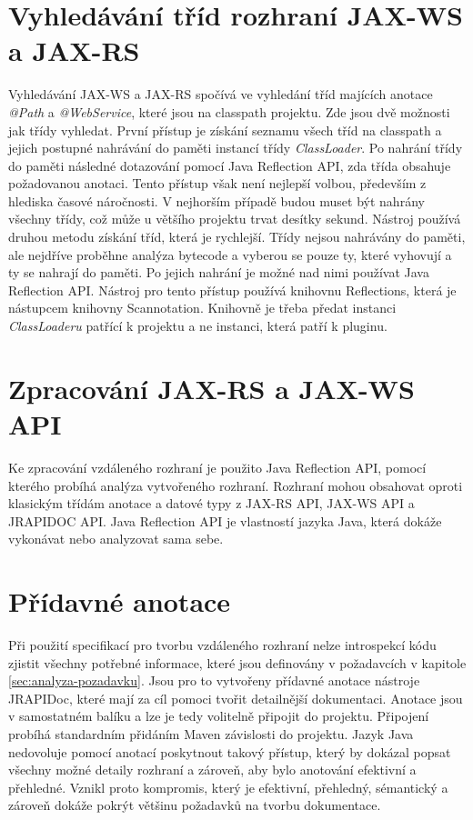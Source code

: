 \documentclass[11pt,twoside,a4paper]{book}
\begin{document}
\section{Vyhledávání tříd rozhraní JAX-WS a JAX-RS}

Vyhledávání JAX-WS a JAX-RS spočívá ve vyhledání tříd majících anotace {\em
@Path} a {\em @WebService}, které jsou na classpath projektu. Zde jsou dvě
možnosti jak třídy vyhledat.
První přístup je získání seznamu všech tříd na classpath a jejich postupné
nahrávání do paměti instancí třídy {\em ClassLoader}. Po nahrání třídy do paměti
následné dotazování pomocí Java Reflection API, zda třída obsahuje požadovanou
anotaci. Tento přístup však není nejlepší volbou, především z hlediska časové
náročnosti. V nejhorším případě budou muset být nahrány všechny třídy, což může
u většího projektu trvat desítky sekund. Nástroj používá druhou metodu získání
tříd, která je rychlejší. Třídy nejsou nahrávány do paměti, ale nejdříve
proběhne analýza bytecode a vyberou se pouze ty, které vyhovují a ty se nahrají do
paměti.
Po jejich nahrání je možné nad nimi používat Java Reflection API. Nástroj pro
tento přístup používá knihovnu Reflections, která je nástupcem knihovny
Scannotation. Knihovně je třeba předat instanci {\em ClassLoaderu} patřící k
projektu a ne instanci, která patří k pluginu.

\section{Zpracování JAX-RS a JAX-WS API}

Ke zpracování vzdáleného rozhraní je použito Java Reflection API, pomocí kterého probíhá
analýza vytvořeného rozhraní. Rozhraní mohou obsahovat oproti klasickým třídám anotace a
datové typy z JAX-RS API, JAX-WS API a JRAPIDOC API. Java Reflection API je
vlastností jazyka Java, která dokáže vykonávat nebo analyzovat sama sebe.

\section{Přídavné anotace}

Při použití specifikací pro tvorbu vzdáleného rozhraní nelze introspekcí kódu
zjistit všechny potřebné informace, které jsou definovány v požadavcích v
kapitole \ref{sec:analyza-pozadavku}.
Jsou pro to vytvořeny přídavné anotace nástroje JRAPIDoc, které mají za cíl
pomoci tvořit detailnější dokumentaci. Anotace jsou v samostatném balíku a lze
je tedy volitelně připojit do projektu. Připojení probíhá standardním přidáním
Maven závislosti do projektu. Jazyk Java nedovoluje pomocí anotací poskytnout
takový přístup, který by dokázal popsat všechny možné detaily rozhraní a
zároveň, aby bylo anotování efektivní a přehledné. Vznikl proto kompromis, který
je efektivní, přehledný, sémantický a zároveň dokáže pokrýt většinu požadavků na
tvorbu dokumentace.
\end{document}
